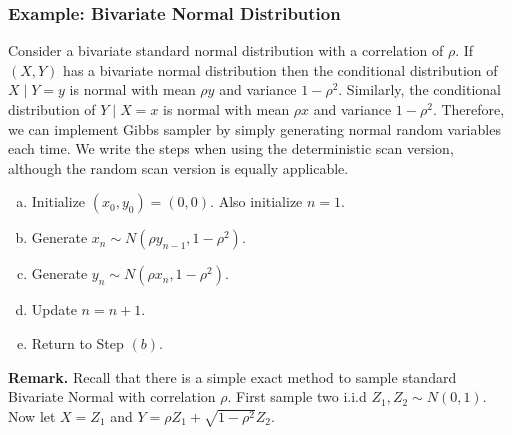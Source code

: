 \documentclass[11pt,a4paper]{article}
\begin{document}
\subsubsection{Example: Bivariate Normal Distribution}
Consider a bivariate standard normal distribution with a correlation of $\rho$. If $(X, Y)$ has a bivariate normal distribution then the conditional distribution of $X \mid Y=y$ is normal with mean $\rho y$ and variance $1-\rho^2$. Similarly, the conditional distribution of $Y \mid X=x$ is normal with mean $\rho x$ and variance $1-\rho^2$. Therefore, we can implement Gibbs sampler by simply generating normal random variables each time. We write the steps when using the deterministic scan version, although the random scan version is equally applicable.
\begin{enumerate}[(a)]
    \item Initialize $\left(x_0, y_0\right)=(0,0)$. Also initialize $n=1$.
    \item Generate $x_n \sim N\left(\rho y_{n-1}, 1-\rho^2\right)$.
    \item Generate $y_n \sim N\left(\rho x_n, 1-\rho^2\right)$.
    \item Update $n=n+1$.
    \item Return to Step $(b)$.
\end{enumerate}
\textbf{Remark.} Recall that there is a simple exact method to sample standard Bivariate Normal with correlation $\rho$. First sample two i.i.d $Z_1, Z_2 \sim N(0,1)$. Now let $X=Z_1$ and $Y=\rho Z_1+\sqrt{1-\rho^2} Z_2$.
\end{document}
